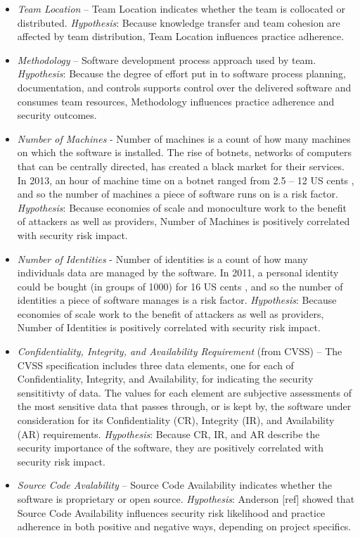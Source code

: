 \begin{itemize}
\item \textit{Team Location} – Team Location indicates whether the team is collocated or distributed. \textit{Hypothesis}: Because knowledge transfer and team cohesion are affected by team distribution, Team Location influences practice adherence.
\item \textit{Methodology} – Software development process approach used by team. \textit{Hypothesis}: Because the degree of effort put in to software process planning, documentation, and controls supports control over the delivered software and consumes team resources, Methodology influences practice adherence and security outcomes.
\item \textit{Number of Machines} - Number of machines is a count of how many machines on which the software is installed. The rise of botnets, networks of computers that can be centrally directed, has created a black market for their services.  In 2013, an hour of machine time on a botnet ranged from 2.5 – 12 US cents , and so the number of machines a piece of software runs on is a risk factor. \textit{Hypothesis}: Because economies of scale and monoculture work to the benefit of attackers as well as providers, Number of Machines is positively correlated with security risk impact.
\item \textit{Number of Identities} - Number of identities is a count of how many individuals data are managed by the software.  In 2011, a personal identity could be bought (in groups of 1000) for 16 US cents  , and so the number of identities a piece of software manages is a risk factor. \textit{Hypothesis}: Because economies of scale work to the benefit of attackers as well as providers, Number of Identities is positively correlated with security risk impact.
\item \textit{Confidentiality, Integrity, and Availability Requirement} (from CVSS) – The CVSS specification includes three data elements, one for each of Confidentiality, Integrity, and Availability, for indicating the security sensititivty of data. The values for each element are subjective assessments of the most sensitive data that passes through, or is kept by, the software under consideration for its Confidentiality (CR), Integrity (IR), and Availability (AR) requirements. \textit{Hypothesis}: Because CR, IR, and AR describe the security importance of the software, they are positively correlated with security risk impact.
\item \textit{Source Code Avalability} – Source Code Availability indicates whether the software is proprietary or open source. \textit{Hypothesis}: Anderson [ref] showed that Source Code Availability influences security risk likelihood and practice adherence in both positive and negative ways, depending on project specifics.
\end{itemize}


